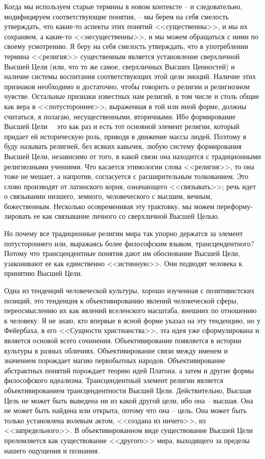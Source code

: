 \documentclass{book}
\begin{document}
Когда мы используем старые термины в новом контексте -- и следовательно, модифицируем соответствующие понятия, -- мы берем на себя смелость утверждать, что какие-то аспекты этих понятий <<существенны>>, и мы их сохраняем, а какие-то <<несущественны>>, и мы можем обращаться с ними по своему усмотрению. Я беру на себя смелость утверждать, что в упот­реблении термина <<религия>> существенным является установ­ление сверхличной Высшей Цели (или, что то же самое, сверх­личных Высших Ценностей) и наличие системы воспитания соответствующих этой цели эмоций. Наличие этих признаков необходимо и достаточно, чтобы говорить о религии и рели­гиозном чувстве. Остальные признаки известных нам религий, в том числе и столь общие как вера в <<потустороннее>>, выра­женная в той или иной форме, должны считаться, я полагаю, несущественными, вторичными. Ибо формирование Высшей Цели   это как раз и есть тот основной элемент религии, кото­рый придает ей историческую роль, приводя в движение массы людей. Поэтому я буду называть религией, без 
всяких кавычек, любую систему формирования Высшей Цели, независимо от то­го, в какой связи она находится с традиционными религиоз­ными учениями. Что касается этимологии слова <<религия>>, то она тоже не мешает, а напротив, согласуется с расширитель­ным толкованием. Это слово производят от латинского корня, означающего <<связывать>>; речь идет о связывании низшего, земного, человеческого с высшим, вечным, божественным. Не­сколько осовременивая эту трактовку, мы можем переформу­лировать ее как связывание личного со сверхличной Высшей Целью.

Но почему все традиционные религии мира так упорно держатся за элемент потустороннего или, выражаясь более философским языком, трансцендентного? Потому что трансцендентные понятия дают им обоснование Высшей Цели, узаконивают ее как единственно <<истинную>>. Они подводят человека к принятию Высшей Цели.

Одна из тенденций человеческой культуры, хорошо изучен­ная с позитивистских позиций, это тенденция к объективированию  явлений человеческой сферы, переосмыслению их как яв­лений вселенского масштаба, внешних по отношению к чело­веку. Я не знаю, кто впервые в ясной форме указал на эту тен­денцию, но у Фейербаха, в его <<Сущности христианства>>, эта идея уже сформулирована и является основой всего сочинения. Объективирование появляется в истории культуры в разных обличиях. Объективирование связи между именем и значением порождает магию первобытных народов. Объективирование абстрактных понятий порождает теорию идей Платона, а затем и другие формы философского идеализма. Трансцендентный элемент религии является объективированием трансцендент­ности Высшей Цели. Действительно, Высшая Цель не может быть выведена ни из какой другой цели, ибо она -- высшая. Она не может быть найдена или открыта, потому что она -- цель. Она может быть только установлена волевым актом, <<создана из ничего>>, из <<запредельного>>. В 
объективирован­ном виде существование Высшей Цели преломляется как су­ществование <<другого>> мира, выходящего за пределы нашего ощущения и познания.
\end{document}
